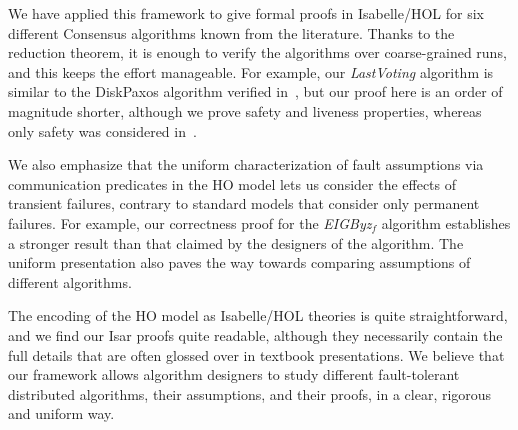 \documentclass[11pt,a4paper]{article}
\newcommand{\eigbyz}{\textit{EIGByz}\ensuremath{_f}}
\begin{document}
We have applied this framework to give formal proofs in Isabelle/HOL
for six different Consensus algorithms known from the literature. 
Thanks to the reduction theorem, it is enough to verify the algorithms
over coarse-grained runs, and this keeps the effort manageable. For
example, our \emph{LastVoting} algorithm is similar to the DiskPaxos
algorithm verified in~\cite{jaskelioff:diskpaxos}, but our proof here
is an order of magnitude shorter, although we prove safety and
liveness properties, whereas only safety was considered
in~\cite{jaskelioff:diskpaxos}.

We also emphasize that the uniform characterization of fault
assumptions via communication predicates in the HO model lets us
consider the effects of transient failures, contrary to standard
models that consider only permanent failures. For example, our
correctness proof for the \eigbyz{} algorithm establishes a stronger
result than that claimed by the designers of the algorithm. The
uniform presentation also paves the way towards comparing assumptions
of different algorithms.

The encoding of the HO model as Isabelle/HOL theories is quite
straightforward, and we find our Isar proofs quite readable, although
they necessarily contain the full details that are often glossed over
in textbook presentations. We believe that our framework allows
algorithm designers to study different fault-tolerant distributed
algorithms, their assumptions, and their proofs, in a clear, rigorous
and uniform way.




\end{document}
